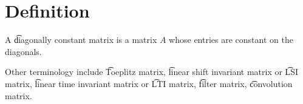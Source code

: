 

\section*{Definition}

A \t{diagonally constant matrix} is a matrix $A$ whose entries are constant on the diagonals.

Other terminology include \t{Toeplitz matrix}, \t{linear shift invariant matrix} or \t{LSI matrix}, \t{linear time invariant matrix} or \t{LTI matrix}, \t{filter matrix}, \t{convolution matrix}.

\blankpage